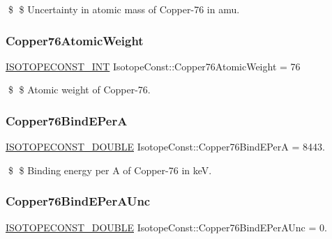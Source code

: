 \$ \$ Uncertainty in atomic mass of Copper-\/76 in amu. \mbox{\label{group___isotope_const-_copper-_cu76_gaa5e18e263e0f0339a01a86853de3585d}} 
\subsubsection{\texorpdfstring{Copper76\+Atomic\+Weight}{Copper76AtomicWeight}}
{\footnotesize\ttfamily \mbox{\hyperlink{group___isotope_const-_macros_ga5f18360b3e99483a35c32d789e62621c}{I\+S\+O\+T\+O\+P\+E\+C\+O\+N\+S\+T\+\_\+\+I\+NT}} Isotope\+Const\+::\+Copper76\+Atomic\+Weight = 76}

\$ \$ Atomic weight of Copper-\/76. \mbox{\label{group___isotope_const-_copper-_cu76_gaf836a42529df7779f203c487a96c9e8d}} 
\subsubsection{\texorpdfstring{Copper76\+Bind\+E\+PerA}{Copper76BindEPerA}}
{\footnotesize\ttfamily \mbox{\hyperlink{group___isotope_const-_macros_ga8f45a7272ce02c0b4c65c44636ed719a}{I\+S\+O\+T\+O\+P\+E\+C\+O\+N\+S\+T\+\_\+\+D\+O\+U\+B\+LE}} Isotope\+Const\+::\+Copper76\+Bind\+E\+PerA = 8443.}

\$ \$ Binding energy per A of Copper-\/76 in keV. \mbox{\label{group___isotope_const-_copper-_cu76_ga8d0689bf1336bd117b2920ce2accbce5}} 
\subsubsection{\texorpdfstring{Copper76\+Bind\+E\+Per\+A\+Unc}{Copper76BindEPerAUnc}}
{\footnotesize\ttfamily \mbox{\hyperlink{group___isotope_const-_macros_ga8f45a7272ce02c0b4c65c44636ed719a}{I\+S\+O\+T\+O\+P\+E\+C\+O\+N\+S\+T\+\_\+\+D\+O\+U\+B\+LE}} Isotope\+Const\+::\+Copper76\+Bind\+E\+Per\+A\+Unc = 0.}

